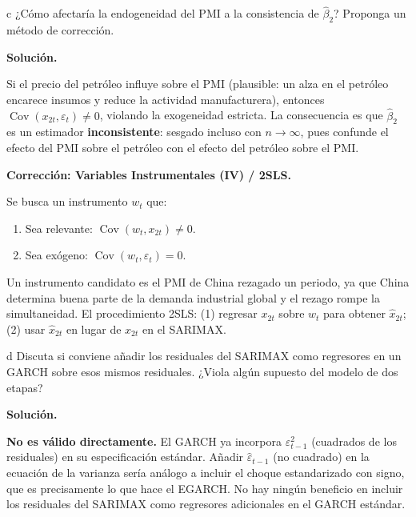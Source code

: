 \documentclass[11pt,a4paper]{article}
\newcommand{\Cov}{\operatorname{Cov}}
\newcommand{\eps}{\varepsilon}
\begin{document}
\begin{cajaInciso}{c}
¿Cómo afectaría la endogeneidad del PMI a la consistencia de $\hat{\beta}_2$? Proponga un método de corrección.
\end{cajaInciso}

\textbf{Solución.}

Si el precio del petróleo influye sobre el PMI (plausible: un alza en el petróleo encarece insumos y reduce la actividad manufacturera), entonces $\Cov(x_{2t}, \eps_t)\neq 0$, violando la exogeneidad estricta. La consecuencia es que $\hat{\beta}_2$ es un estimador \textbf{inconsistente}: sesgado incluso con $n\to\infty$, pues confunde el efecto del PMI sobre el petróleo con el efecto del petróleo sobre el PMI.

\textbf{Corrección: Variables Instrumentales (IV) / 2SLS.}

Se busca un instrumento $w_t$ que:
\begin{enumerate}[leftmargin=*]
  \item Sea relevante: $\Cov(w_t, x_{2t})\neq 0$.
  \item Sea exógeno: $\Cov(w_t, \eps_t)=0$.
\end{enumerate}

Un instrumento candidato es el PMI de China rezagado un periodo, ya que China determina buena parte de la demanda industrial global y el rezago rompe la simultaneidad. El procedimiento 2SLS: (1) regresar $x_{2t}$ sobre $w_t$ para obtener $\hat{x}_{2t}$; (2) usar $\hat{x}_{2t}$ en lugar de $x_{2t}$ en el SARIMAX.

\begin{cajaInciso}{d}
Discuta si conviene añadir los residuales del SARIMAX como regresores en un GARCH sobre esos mismos residuales. ¿Viola algún supuesto del modelo de dos etapas?
\end{cajaInciso}

\textbf{Solución.}

\textbf{No es válido directamente.} El GARCH ya incorpora $\eps_{t-1}^2$ (cuadrados de los residuales) en su especificación estándar. Añadir $\hat{\eps}_{t-1}$ (no cuadrado) en la ecuación de la varianza sería análogo a incluir el choque estandarizado con signo, que es precisamente lo que hace el EGARCH. No hay ningún beneficio en incluir los residuales del SARIMAX como regresores adicionales en el GARCH estándar.
\end{document}
